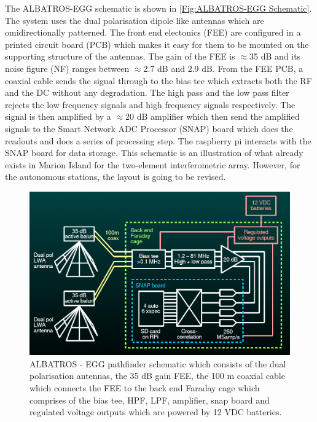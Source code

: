\documentclass[12pt,a4paper]{report}
\begin{document}
The ALBATROS-EGG schematic is shown in \autoref{Fig:ALBATROS-EGG Schematic}. The system uses the dual polarisation dipole like antennas which are omidirectionally patterned. The front end electonics (FEE) are configured in a printed circuit board (PCB) which makes it easy for them to be mounted on the supporting structure of the antennas. The gain of the FEE is $\approx$35 dB and its noise figure (NF) ranges between $\approx$2.7 dB and 2.9 dB. From the FEE PCB, a coaxial cable sends the signal through to the bias tee which extracts both the RF and the DC without any degradation. \newline The high pass and the low pass filter rejects the low frequency signals and high frequency signals respectively. The signal is then amplified by a $\approx$20 dB amplifier which then send the amplified signals to the Smart Network ADC Processor (SNAP) board which does the readouts and does a series of processing step. The raspberry pi interacts with the SNAP board for data storage.  This schematic is an illustration of what already exists in Marion Island for the two-element interferometric array. However, for the autonomous stations, the layout is going to be revised. 

 		
		\begin{figure}[!ht]
				\begin{center}
					\includegraphics[width=0.9\linewidth]{Figures/ALBATROS-EGG-Schematic.PNG}
					\caption{ALBATROS - EGG pathfinder schematic which consists of the dual polarisation antennas, the 35 dB gain FEE, the 100 m coaxial cable which connects the FEE to the back end Faraday cage which comprises of the bias tee, HPF, LPF, amplifier, snap board and regulated voltage outputs which are powered by 12 VDC batteries.}
					\label{Fig:ALBATROS-EGG Schematic}
				\end{center}
		\end{figure}
			
\end{document}
